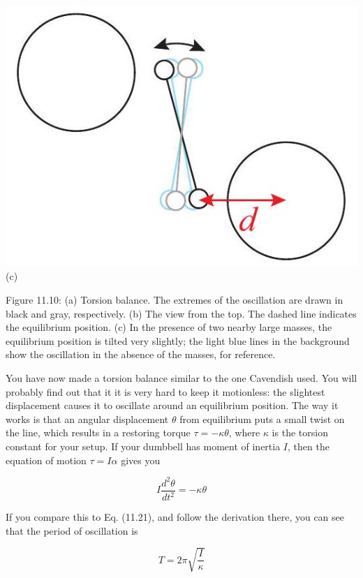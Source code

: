 \documentclass[10pt]{article}
\begin{document}
\includegraphics[max width=\textwidth, center]{2024_09_14_9969b06773f10b6936e8g-292}\\
(c)

Figure 11.10: (a) Torsion balance. The extremes of the oscillation are drawn in black and gray, respectively. (b) The view from the top. The dashed line indicates the equilibrium position. (c) In the presence of two nearby large masses, the equilibrium position is tilted very slightly; the light blue lines in the background show the oscillation in the absence of the masses, for reference.

You have now made a torsion balance similar to the one Cavendish used. You will probably find out that it it is very hard to keep it motionless: the slightest displacement causes it to oscillate around an equilibrium position. The way it works is that an angular displacement $\theta$ from equilibrium puts a small twist on the line, which results in a restoring torque $\tau=-\kappa \theta$, where $\kappa$ is the torsion constant for your setup. If your dumbbell has moment of inertia $I$, then the equation of motion $\tau=I \alpha$ gives you


\begin{equation*}
I \frac{d^{2} \theta}{d t^{2}}=-\kappa \theta \tag{11.35}
\end{equation*}


If you compare this to Eq. (11.21), and follow the derivation there, you can see that the period of oscillation is


\begin{equation*}
T=2 \pi \sqrt{\frac{I}{\kappa}} \tag{11.36}
\end{equation*}
\end{document}
